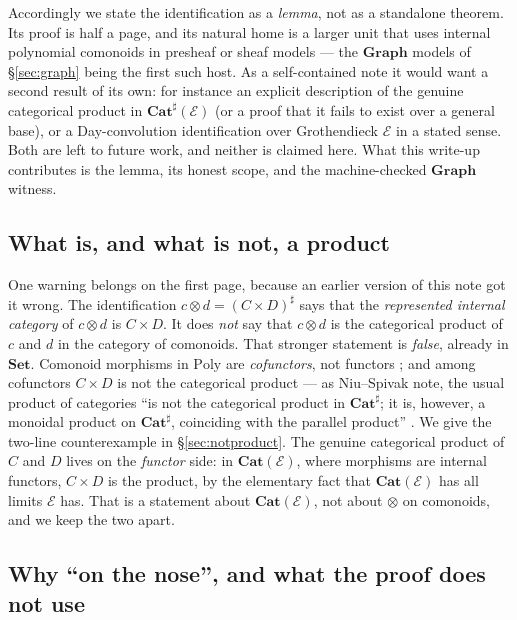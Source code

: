 \documentclass[11pt]{amsart}
\theoremstyle{plain}
\theoremstyle{definition}
\theoremstyle{remark}
\newcommand{\Set}{\mathbf{Set}}
\newcommand{\Cat}{\mathbf{Cat}}
\newcommand{\Graph}{\mathbf{Graph}}
\newcommand{\Poly}{\mathrm{Poly}}
\newcommand{\Ee}{\mathcal{E}}
\newcommand{\sharpc}[1]{#1^{\sharp}}   %
\begin{document}
Accordingly we state the identification as a \emph{lemma}, not as a standalone theorem. Its proof is
half a page, and its natural home is a larger unit that uses internal polynomial comonoids in
presheaf or sheaf models --- the $\Graph$ models of \S\ref{sec:graph} being the first such host. As a
self-contained note it would want a second result of its own: for instance an explicit description of
the genuine categorical product in $\Cat^{\sharp}(\Ee)$ (or a proof that it fails to exist over a
general base), or a Day-convolution identification over Grothendieck $\Ee$ in a stated sense. Both are
left to future work, and neither is claimed here. What this write-up contributes is the lemma, its
honest scope, and the machine-checked $\Graph$ witness.

\subsection*{What is, and what is not, a product}

One warning belongs on the first page, because an earlier version of this note got it wrong. The
identification $c\otimes d=\sharpc{(C\times D)}$ says that the \emph{represented internal category}
of $c\otimes d$ is $C\times D$. It does \emph{not} say that $c\otimes d$ is the categorical product
of $c$ and $d$ in the category of comonoids. That stronger statement is \emph{false}, already in
$\Set$. Comonoid morphisms in $\Poly$ are \emph{cofunctors}, not functors
\cite[Cor.~5.12, Def.~5.11]{ShapiroSpivak2023}; and among cofunctors $C\times D$ is not the
categorical product --- as Niu--Spivak note, the usual product of categories ``is not the categorical
product in $\Cat^{\sharp}$; it is, however, a monoidal product on $\Cat^{\sharp}$, coinciding with the
parallel product'' \cite[\S8.2.4]{NiuSpivak2023}. We give the two-line counterexample in
\S\ref{sec:notproduct}. The genuine categorical product of $C$ and $D$ lives on the \emph{functor}
side: in $\Cat(\Ee)$, where morphisms are internal functors, $C\times D$ is the product, by the
elementary fact that $\Cat(\Ee)$ has all limits $\Ee$ has. That is a statement about $\Cat(\Ee)$, not
about $\otimes$ on comonoids, and we keep the two apart.

\subsection*{Why ``on the nose'', and what the proof does not use}
\end{document}
